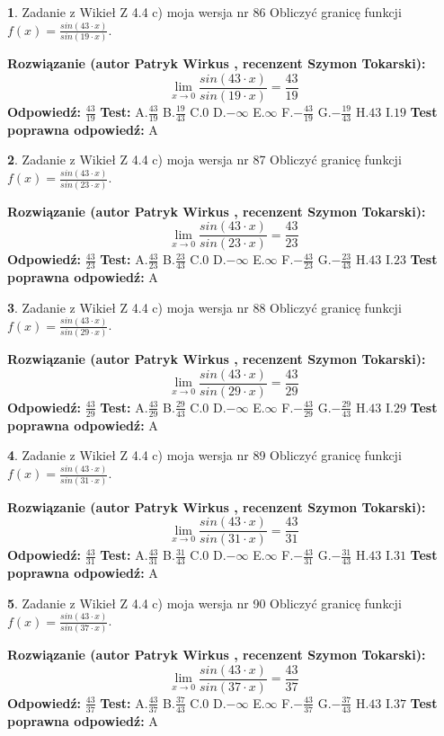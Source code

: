 \documentclass[12pt, a4paper]{article}
\theoremstyle{definition} %
\newtheorem{zad}{}
\newcommand{\zadStart}[1]{\begin{zad}#1\newline}
\newcommand{\zadStop}{\end{zad}}
\newcommand{\rozwStart}[2]{\noindent \textbf{Rozwiązanie (autor #1 , recenzent #2): }\newline}
\newcommand{\rozwStop}{\newline}
\newcommand{\odpStart}{\noindent \textbf{Odpowiedź:}\newline}
\newcommand{\odpStop}{\newline}
\newcommand{\testStart}{\noindent \textbf{Test:}\newline}
\newcommand{\testStop}{\newline}
\newcommand{\kluczStart}{\noindent \textbf{Test poprawna odpowiedź:}\newline}
\newcommand{\kluczStop}{\newline}
\begin{document}
\zadStart{Zadanie z Wikieł Z 4.4 c) moja wersja nr 86}
Obliczyć granicę funkcji $f(x)=\frac{sin(43\cdot x)}{sin(19\cdot x)}$.
\zadStop
\rozwStart{Patryk Wirkus}{Szymon Tokarski}
$$\lim\limits_{x\to 0}\frac{sin(43\cdot x)}{sin(19\cdot x)}=
\frac{43}{19}$$
\rozwStop
\odpStart
$\frac{43}{19}$
\odpStop
\testStart
A.$\frac{43}{19}$
B.$\frac{19}{43}$
C.$0$
D.$-\infty$
E.$\infty$
F.$-\frac{43}{19}$
G.$-\frac{19}{43}$
H.$43$
I.$19$
\testStop
\kluczStart
A
\kluczStop



\zadStart{Zadanie z Wikieł Z 4.4 c) moja wersja nr 87}
Obliczyć granicę funkcji $f(x)=\frac{sin(43\cdot x)}{sin(23\cdot x)}$.
\zadStop
\rozwStart{Patryk Wirkus}{Szymon Tokarski}
$$\lim\limits_{x\to 0}\frac{sin(43\cdot x)}{sin(23\cdot x)}=
\frac{43}{23}$$
\rozwStop
\odpStart
$\frac{43}{23}$
\odpStop
\testStart
A.$\frac{43}{23}$
B.$\frac{23}{43}$
C.$0$
D.$-\infty$
E.$\infty$
F.$-\frac{43}{23}$
G.$-\frac{23}{43}$
H.$43$
I.$23$
\testStop
\kluczStart
A
\kluczStop



\zadStart{Zadanie z Wikieł Z 4.4 c) moja wersja nr 88}
Obliczyć granicę funkcji $f(x)=\frac{sin(43\cdot x)}{sin(29\cdot x)}$.
\zadStop
\rozwStart{Patryk Wirkus}{Szymon Tokarski}
$$\lim\limits_{x\to 0}\frac{sin(43\cdot x)}{sin(29\cdot x)}=
\frac{43}{29}$$
\rozwStop
\odpStart
$\frac{43}{29}$
\odpStop
\testStart
A.$\frac{43}{29}$
B.$\frac{29}{43}$
C.$0$
D.$-\infty$
E.$\infty$
F.$-\frac{43}{29}$
G.$-\frac{29}{43}$
H.$43$
I.$29$
\testStop
\kluczStart
A
\kluczStop



\zadStart{Zadanie z Wikieł Z 4.4 c) moja wersja nr 89}
Obliczyć granicę funkcji $f(x)=\frac{sin(43\cdot x)}{sin(31\cdot x)}$.
\zadStop
\rozwStart{Patryk Wirkus}{Szymon Tokarski}
$$\lim\limits_{x\to 0}\frac{sin(43\cdot x)}{sin(31\cdot x)}=
\frac{43}{31}$$
\rozwStop
\odpStart
$\frac{43}{31}$
\odpStop
\testStart
A.$\frac{43}{31}$
B.$\frac{31}{43}$
C.$0$
D.$-\infty$
E.$\infty$
F.$-\frac{43}{31}$
G.$-\frac{31}{43}$
H.$43$
I.$31$
\testStop
\kluczStart
A
\kluczStop



\zadStart{Zadanie z Wikieł Z 4.4 c) moja wersja nr 90}
Obliczyć granicę funkcji $f(x)=\frac{sin(43\cdot x)}{sin(37\cdot x)}$.
\zadStop
\rozwStart{Patryk Wirkus}{Szymon Tokarski}
$$\lim\limits_{x\to 0}\frac{sin(43\cdot x)}{sin(37\cdot x)}=
\frac{43}{37}$$
\rozwStop
\odpStart
$\frac{43}{37}$
\odpStop
\testStart
A.$\frac{43}{37}$
B.$\frac{37}{43}$
C.$0$
D.$-\infty$
E.$\infty$
F.$-\frac{43}{37}$
G.$-\frac{37}{43}$
H.$43$
I.$37$
\testStop
\kluczStart
A
\kluczStop
\end{document}
